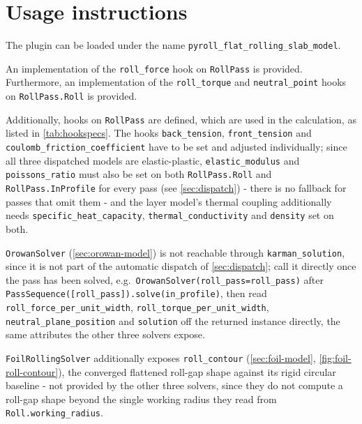 \documentclass[11pt]{PyRollDocs}
\begin{document}
    \section{Usage instructions}\label{sec:usage-instructions}
    The plugin can be loaded under the name \texttt{pyroll\_flat\_rolling\_slab\_model}.

    An implementation of the \lstinline{roll_force} hook on \lstinline{RollPass} is provided.
    Furthermore, an implementation of the \lstinline{roll_torque} and \lstinline{neutral_point} hooks on \lstinline{RollPass.Roll} is provided.

    Additionally, hooks on \lstinline{RollPass} are defined, which are used in the calculation, as listed in \autoref{tab:hookspecs}.
    The hooks \lstinline{back_tension}, \lstinline{front_tension} and \lstinline{coulomb_friction_coefficient} have to be set and adjusted individually; since all three dispatched models are elastic-plastic, \lstinline{elastic_modulus} and \lstinline{poissons_ratio} must also be set on both \lstinline{RollPass.Roll} and \lstinline{RollPass.InProfile} for every pass (see \autoref{sec:dispatch}) - there is no fallback for passes that omit them - and the layer model's thermal coupling additionally needs \lstinline{specific_heat_capacity}, \lstinline{thermal_conductivity} and \lstinline{density} set on both.

    \lstinline{OrowanSolver} (\autoref{sec:orowan-model}) is not reachable through \lstinline{karman_solution}, since it is not part of the automatic dispatch of \autoref{sec:dispatch}; call it directly once the pass has been solved, e.g.\ \lstinline{OrowanSolver(roll_pass=roll_pass)} after \lstinline{PassSequence([roll_pass]).solve(in_profile)}, then read \lstinline{roll_force_per_unit_width}, \lstinline{roll_torque_per_unit_width}, \lstinline{neutral_plane_position} and \lstinline{solution} off the returned instance directly, the same attributes the other three solvers expose.

    \lstinline{FoilRollingSolver} additionally exposes \lstinline{roll_contour} (\autoref{sec:foil-model}, \autoref{fig:foil-roll-contour}), the converged flattened roll-gap shape against its rigid circular baseline - not provided by the other three solvers, since they do not compute a roll-gap shape beyond the single working radius they read from \lstinline{Roll.working_radius}.
\end{document}
